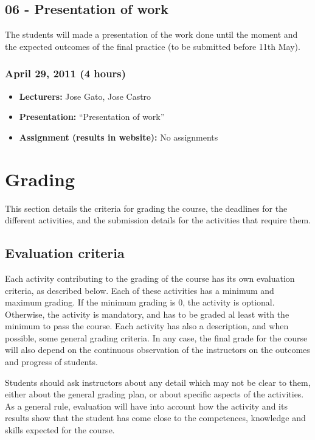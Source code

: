 \documentclass[a4paper]{article}
\begin{document}
\subsection{06 - Presentation of work}

The students will made a presentation of the work done until the moment and the expected outcomes of the final practice (to be submitted before 11th May).

\subsubsection{April 29, 2011 (4 hours)}

\begin{itemize}
\item \textbf{Lecturers:} Jose Gato, Jose Castro
\item \textbf{Presentation:} ``Presentation of work''
\item \textbf{Assignment (results in website):} No assignments
\end{itemize}





\section{Grading}

This section details the criteria for grading the course, the
deadlines for the different activities, and the submission details for
the activities that require them.

\subsection{Evaluation criteria}
\label{sub:evaluation-criteria}

Each activity contributing to the grading of the course has its own
evaluation criteria, as described below. Each of these activities has
a minimum and maximum grading. If the minimum grading is 0, the
activity is optional. Otherwise, the activity is mandatory, and has to
be graded al least with the minimum to pass the course. Each activity
has also a description, and when possible, some general grading
criteria. In any case, the final grade for the course will also depend
on the continuous observation of the instructors on the outcomes and
progress of students.

Students should ask instructors about any detail which may not be
clear to them, either about the general grading plan, or about
specific aspects of the activities. As a general rule, evaluation will
have into account how the activity and its results show that the
student has come close to the competences, knowledge and skills
expected for the course.
\end{document}
